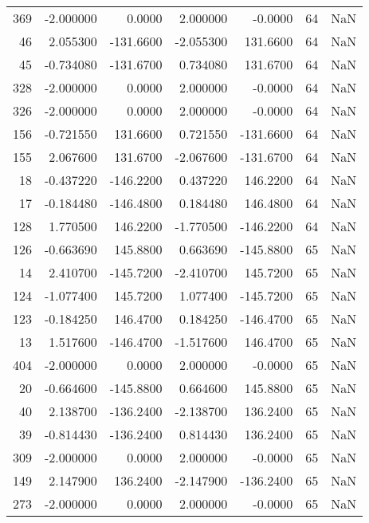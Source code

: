 \begin{tabular}{rrrrrrr}
369 &   -2.000000 &    0.0000 &    2.000000 &     -0.0000 &          64 & NaN \\
 46 &    2.055300 & -131.6600 &   -2.055300 &    131.6600 &          64 & NaN \\
 45 &   -0.734080 & -131.6700 &    0.734080 &    131.6700 &          64 & NaN \\
328 &   -2.000000 &    0.0000 &    2.000000 &     -0.0000 &          64 & NaN \\
326 &   -2.000000 &    0.0000 &    2.000000 &     -0.0000 &          64 & NaN \\
156 &   -0.721550 &  131.6600 &    0.721550 &   -131.6600 &          64 & NaN \\
155 &    2.067600 &  131.6700 &   -2.067600 &   -131.6700 &          64 & NaN \\
 18 &   -0.437220 & -146.2200 &    0.437220 &    146.2200 &          64 & NaN \\
 17 &   -0.184480 & -146.4800 &    0.184480 &    146.4800 &          64 & NaN \\
128 &    1.770500 &  146.2200 &   -1.770500 &   -146.2200 &          64 & NaN \\
126 &   -0.663690 &  145.8800 &    0.663690 &   -145.8800 &          65 & NaN \\
 14 &    2.410700 & -145.7200 &   -2.410700 &    145.7200 &          65 & NaN \\
124 &   -1.077400 &  145.7200 &    1.077400 &   -145.7200 &          65 & NaN \\
123 &   -0.184250 &  146.4700 &    0.184250 &   -146.4700 &          65 & NaN \\
 13 &    1.517600 & -146.4700 &   -1.517600 &    146.4700 &          65 & NaN \\
404 &   -2.000000 &    0.0000 &    2.000000 &     -0.0000 &          65 & NaN \\
 20 &   -0.664600 & -145.8800 &    0.664600 &    145.8800 &          65 & NaN \\
 40 &    2.138700 & -136.2400 &   -2.138700 &    136.2400 &          65 & NaN \\
 39 &   -0.814430 & -136.2400 &    0.814430 &    136.2400 &          65 & NaN \\
309 &   -2.000000 &    0.0000 &    2.000000 &     -0.0000 &          65 & NaN \\
149 &    2.147900 &  136.2400 &   -2.147900 &   -136.2400 &          65 & NaN \\
273 &   -2.000000 &    0.0000 &    2.000000 &     -0.0000 &          65 & NaN \\

\end{tabular}
